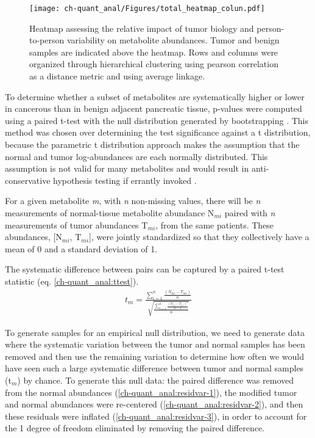 \begin{figure}[h!]
\begin{center}
\texttt{[image: ch-quant\_anal/Figures/total\_heatmap\_colun.pdf]}
\caption[Heatmap assessing the relative impact of tumor biology and person-to-person variability on metabolite abundances.]{Heatmap assessing the relative impact of tumor biology and person-to-person variability on metabolite abundances.  Tumor and benign samples are indicated above the heatmap.  Rows and columns were organized through hierarchical clustering using pearson correlation as a distance metric and using average linkage.}
\label{ch-quant_anal:all_sample_heatmap}
\end{center}
\end{figure}

To determine whether a subset of metabolites are systematically higher or lower in cancerous than in benign adjacent pancreatic tissue, p-values were computed using a paired t-test with the null distribution generated by bootstrapping \cite{Efron:1986cv}.  This method was chosen over determining the test significance against a t distribution, because the parametric t distribution approach makes the assumption that the normal and tumor log-abundances are each normally distributed.  This assumption is not valid for many metabolites and would result in anti-conservative hypothesis testing if errantly invoked \cite{Schmoyeri:1996uh}.

For a given metabolite \textit{m}, with \textit{n} non-missing values, there will be \textit{n} measurements of normal-tissue metabolite abundance N$_{mi}$ paired with \textit{n} measurements of tumor abundances T$_{mi}$, from the same patients.  These abundances, [N$_{mi}$, T$_{mi}$], were jointly standardized so that they collectively have a mean of 0 and a standard deviation of 1.  

The systematic difference between pairs can be captured by a paired t-test statistic (eq. \ref{ch-quant_anal:ttest}). \vspace{3mm}
\begin{align}
t_{m} = \frac{\sum_{i = 1}^{n}\frac{(N_{mi} - T_{mi})}{n}}{\sqrt{\frac{\sum_{i = 1}^{n}\frac{(N_{mi} - T_{mi})^{2}}{n-1}}{n}}}\label{ch-quant_anal:ttest}
\end{align}

To generate samples for an empirical null distribution, we need to generate data where the systematic variation between the tumor and normal samples has been removed and then use the remaining variation to determine how often we would have seen such a large systematic difference between tumor and normal samples (t$_{m}$) by chance.  To generate this null data: the paired difference was removed from the normal abundances (\ref{ch-quant_anal:residvar-1}), the modified tumor and normal abundances were re-centered (\ref{ch-quant_anal:residvar-2}), and then these residuals were inflated (\ref{ch-quant_anal:residvar-3}), in order to account for the 1 degree of freedom eliminated by removing the paired difference.

